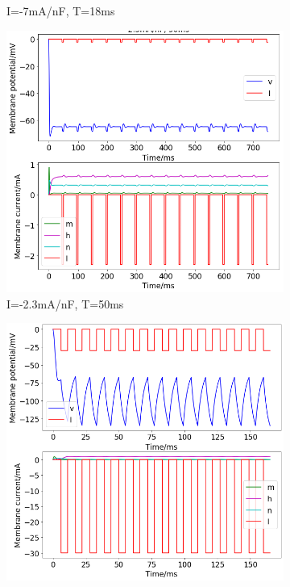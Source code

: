 \documentclass[twoside,twocolumn]{article}
\begin{document}
\begin{figure}[h]
\begin{subfigure}[t]{0.49\textwidth}
  \caption{I=-7mA/nF, T=18ms}
  \label{sub:2d7-18}
  \end{subfigure}
\newline
  \begin{subfigure}[t]{0.49\textwidth}
    \includegraphics[width=\linewidth]{n23-50}
  \caption{I=-2.3mA/nF, T=50ms}
  \label{sub:2d23-50}
  \end{subfigure}
  \begin{subfigure}[t]{0.49\textwidth}
    \includegraphics[width=\linewidth]{n30-11}

\end{subfigure}
\end{figure}
\end{document}
